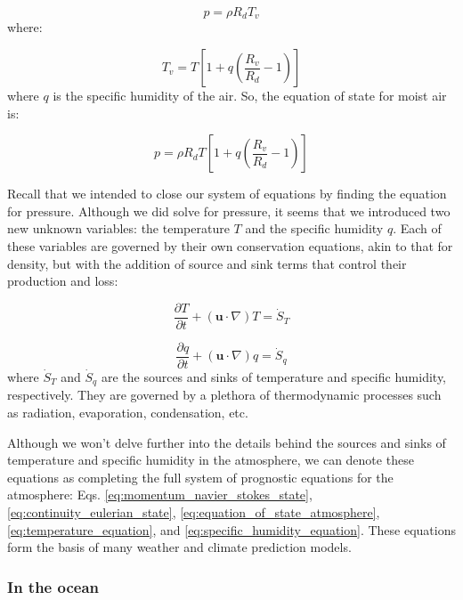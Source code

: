 \documentclass[12pt]{article}
\numberwithin{equation}{section}
\numberwithin{figure}{section}
\numberwithin{table}{section}
\begin{document}
\begin{equation}
  p = \rho R_d T_v
\end{equation}
where:

\begin{equation}
  T_v = T \left[1 + q \left(\frac{R_v}{R_d} - 1 \right) \right]
\end{equation}
where $q$ is the specific humidity of the air.
So, the equation of state for moist air is:

\begin{equation}
  p = \rho R_d T \left[1 + q \left(\frac{R_v}{R_d} - 1 \right) \right]
  \label{eq:equation_of_state_atmosphere}
\end{equation}

Recall that we intended to close our system of equations by finding the
equation for pressure.
Although we did solve for pressure, it seems that we introduced two new
unknown variables: the temperature $T$ and the specific humidity $q$.
Each of these variables are governed by their own conservation equations,
akin to that for density, but with the addition of source and sink terms
that control their production and loss:

\begin{equation}
  \frac{\partial T}{\partial t} + (\mathbf{u} \cdot \nabla) T = \dot{S}_T
  \label{eq:temperature_equation}
\end{equation}

\begin{equation}
  \frac{\partial q}{\partial t} + (\mathbf{u} \cdot \nabla) q = \dot{S}_q
  \label{eq:specific_humidity_equation}
\end{equation}
where $\dot{S}_T$ and $\dot{S}_q$ are the sources and sinks of temperature and
specific humidity, respectively.
They are governed by a plethora of thermodynamic processes such as radiation,
evaporation, condensation, etc.

Although we won't delve further into the details behind the sources and sinks
of temperature and specific humidity in the atmosphere, we can denote these
equations as completing the full system of prognostic equations for the
atmosphere: Eqs. \ref{eq:momentum_navier_stokes_state}, 
\ref{eq:continuity_eulerian_state},
\ref{eq:equation_of_state_atmosphere},
\ref{eq:temperature_equation}, and
\ref{eq:specific_humidity_equation}.
These equations form the basis of many weather and climate prediction models.

\subsubsection{In the ocean}
\end{document}

